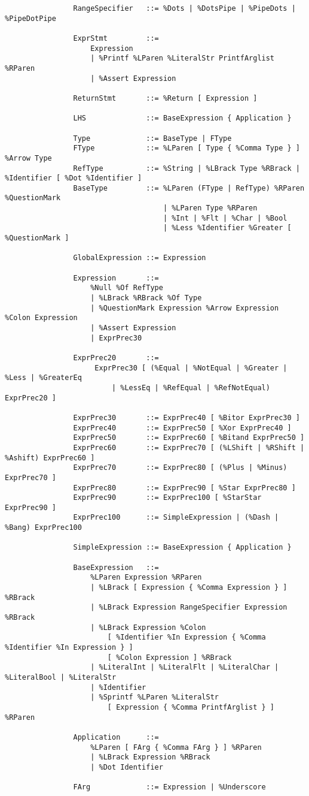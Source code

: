 \documentclass{article}
\begin{document}
\begin{small}
\begin{verbatim}
				RangeSpecifier   ::= %Dots | %DotsPipe | %PipeDots | %PipeDotPipe
				                 
				ExprStmt         ::=
				    Expression
				    | %Printf %LParen %LiteralStr PrintfArglist %RParen
				    | %Assert Expression
				                 
				ReturnStmt       ::= %Return [ Expression ]
				                 
				LHS              ::= BaseExpression { Application }
				
				Type             ::= BaseType | FType
				FType            ::= %LParen [ Type { %Comma Type } ] %Arrow Type
				RefType          ::= %String | %LBrack Type %RBrack | %Identifier [ %Dot %Identifier ]
				BaseType         ::= %LParen (FType | RefType) %RParen %QuestionMark
				                     | %LParen Type %RParen
				                     | %Int | %Flt | %Char | %Bool
				                     | %Less %Identifier %Greater [ %QuestionMark ]          
				                 
				GlobalExpression ::= Expression
			
				Expression       ::=
				    %Null %Of RefType
				    | %LBrack %RBrack %Of Type
				    | %QuestionMark Expression %Arrow Expression %Colon Expression
 				    | %Assert Expression
				    | ExprPrec30
				
				ExprPrec20       ::=
				     ExprPrec30 [ (%Equal | %NotEqual | %Greater | %Less | %GreaterEq
				         | %LessEq | %RefEqual | %RefNotEqual) ExprPrec20 ]
				         
				ExprPrec30       ::= ExprPrec40 [ %Bitor ExprPrec30 ]
				ExprPrec40       ::= ExprPrec50 [ %Xor ExprPrec40 ]
				ExprPrec50       ::= ExprPrec60 [ %Bitand ExprPrec50 ]
				ExprPrec60       ::= ExprPrec70 [ (%LShift | %RShift | %Ashift) ExprPrec60 ]
				ExprPrec70       ::= ExprPrec80 [ (%Plus | %Minus) ExprPrec70 ]
				ExprPrec80       ::= ExprPrec90 [ %Star ExprPrec80 ]
				ExprPrec90       ::= ExprPrec100 [ %StarStar ExprPrec90 ]
				ExprPrec100      ::= SimpleExpression | (%Dash | %Bang) ExprPrec100
				                 
				SimpleExpression ::= BaseExpression { Application }
				
				BaseExpression   ::=
				    %LParen Expression %RParen
				    | %LBrack [ Expression { %Comma Expression } ] %RBrack
				    | %LBrack Expression RangeSpecifier Expression %RBrack
				    | %LBrack Expression %Colon
				        [ %Identifier %In Expression { %Comma %Identifier %In Expression } ]
				        [ %Colon Expression ] %RBrack
				    | %LiteralInt | %LiteralFlt | %LiteralChar | %LiteralBool | %LiteralStr
				    | %Identifier
				    | %Sprintf %LParen %LiteralStr
				        [ Expression { %Comma PrintfArglist } ] %RParen
				                 
				Application      ::=
				    %LParen [ FArg { %Comma FArg } ] %RParen
				    | %LBrack Expression %RBrack
				    | %Dot Identifier
				                 
				FArg             ::= Expression | %Underscore
			\end{verbatim}\end{small}
	
\end{document}
